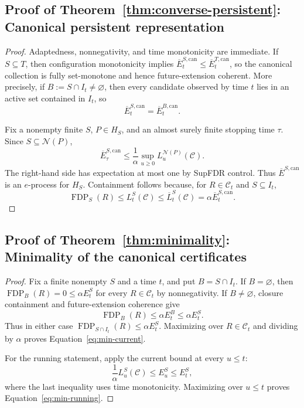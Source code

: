 \documentclass[11pt]{article}
\numberwithin{equation}{section}
\theoremstyle{plain}
\theoremstyle{definition}
\newcommand{\C}{\mathcal C}
\newcommand{\FDP}{\operatorname{FDP}}
\newcommand{\calN}{\mathcal N}
\newcommand{\loss}{L}
\newcommand{\runloss}{\overline L}
\newcommand{\can}{\mathrm{can}}
\begin{document}
\subsection{Proof of Theorem~\ref{thm:converse-persistent}: Canonical persistent representation}\label{app:proof-converse-persistent}

\begin{proof}
Adaptedness, nonnegativity, and time monotonicity are immediate. If $S\subseteq T$, then configuration monotonicity implies $\overline E_t^{S,\can}\leq\overline E_t^{T,\can}$, so the canonical collection is fully set-monotone and hence future-extension coherent. More precisely, if $B:=S\cap I_t\neq\varnothing$, then every candidate observed by time $t$ lies in an active set contained in $I_t$, so
\[
  \overline E_t^{S,\can}=\overline E_t^{B,\can}.
\]

Fix a nonempty finite $S$, $P\in H_S$, and an almost surely finite stopping time $\tau$. Since $S\subseteq\calN(P)$,
\[
  \overline E_\tau^{S,\can}
  \leq\frac1\alpha\sup_{u\geq0}\loss_u^{\calN(P)}(\C).
\]
The right-hand side has expectation at most one by SupFDR control. Thus $\overline E^{S,\can}$ is an $e$-process for $H_S$. Containment follows because, for $R\in\C_t$ and $S\subseteq I_t$,
\[
  \FDP_S(R)\leq\loss_t^S(\C)\leq\runloss_t^S(\C)
  =\alpha\overline E_t^{S,\can}.
\]
\end{proof}

\subsection{Proof of Theorem~\ref{thm:minimality}: Minimality of the canonical certificates}\label{app:proof-minimality}

\begin{proof}
Fix a finite nonempty $S$ and a time $t$, and put $B=S\cap I_t$. If $B=\varnothing$, then $\FDP_B(R)=0\leq\alpha E_t^S$ for every $R\in\C_t$ by nonnegativity. If $B\neq\varnothing$, closure containment and future-extension coherence give
\[
  \FDP_B(R)
  \leq\alpha E_t^B
  \leq\alpha E_t^S.
\]
Thus in either case $\FDP_{S\cap I_t}(R)\leq\alpha E_t^S$. Maximizing over $R\in\C_t$ and dividing by $\alpha$ proves Equation~\eqref{eq:min-current}.

For the running statement, apply the current bound at every $u\leq t$:
\[
  \frac1\alpha\loss_u^S(\C)\leq E_u^S\leq E_t^S,
\]
where the last inequality uses time monotonicity. Maximizing over $u\leq t$ proves Equation~\eqref{eq:min-running}.
\end{proof}
\end{document}
